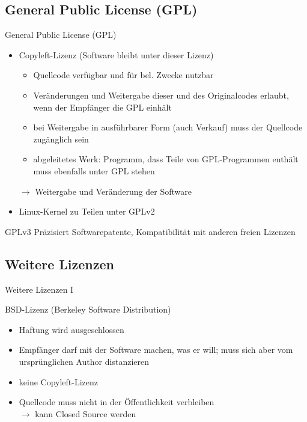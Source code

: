\documentclass[aspectratio=43]{beamer}
\begin{document}
\subsection{General Public License (GPL)}
\begin{frame}
  \begin{block}{General Public License (GPL)}
    \begin{itemize}
      \item Copyleft-Lizenz (Software bleibt unter dieser Lizenz)
      \begin{itemize}
        \item Quellcode verfügbar und für bel. Zwecke nutzbar
        \item Veränderungen und Weitergabe dieser und des Originalcodes erlaubt, wenn der Empfänger die GPL einhält
        \item bei Weitergabe in ausführbarer Form (auch Verkauf) muss der Quellcode zugänglich sein
        \item abgeleitetes Werk: Programm, dass Teile von GPL-Programmen enthält muss ebenfalls 
              unter GPL stehen
      \end{itemize}
      $\rightarrow$ Weitergabe und Veränderung der Software
      \item Linux-Kernel zu Teilen unter GPLv2
    \end{itemize}
  \end{block}
  \begin{block}{GPLv3}
    Präzisiert Softwarepatente, Kompatibilität mit anderen freien Lizenzen
  \end{block}
\end{frame}

\subsection{Weitere Lizenzen}
\begin{frame}{Weitere Lizenzen I}
  \begin{block}{BSD-Lizenz (Berkeley Software Distribution)}
    \begin{itemize}
      \item Haftung wird ausgeschlossen
      \item Empfänger darf mit der Software machen, was er will; muss sich aber vom 
            ursprünglichen Author distanzieren
      \item keine Copyleft-Lizenz
      \item Quellcode muss nicht in der Öffentlichkeit verbleiben\\
      $\rightarrow$ kann Closed Source werden
    \end{itemize}
  \end{block}
\end{frame}
\end{document}
